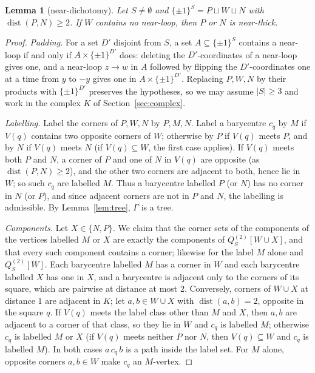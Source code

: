 \documentclass[11pt,letterpaper]{article}
\newtheorem{lemma}[theorem]{Lemma}
\theoremstyle{definition}
\newcommand{\cube}[1]{\{\pm1\}^{#1}}
\DeclareMathOperator{\dist}{dist}
\begin{document}
\begin{lemma}[near-dichotomy]\label{lem:neardichotomy}
Let $S\ne\emptyset$ and $\cube S=P\sqcup W\sqcup N$ with $\dist(P,N)\ge2$. If $W$ contains no
near-loop, then $P$ or $N$ is near-thick.
\end{lemma}

\begin{proof}
\emph{Padding.} For a set $D'$ disjoint from $S$, a set $A\subseteq\cube S$ contains a near-loop if and
only if $A\times\cube{D'}$ does: deleting the $D'$-coordinates of a near-loop gives one, and a near-loop
$z\to w$ in $A$ followed by flipping the $D'$-coordinates one at a time from $y$ to $-y$ gives one in
$A\times\cube{D'}$. Replacing $P,W,N$ by their products with $\cube{D'}$ preserves the hypotheses, so we
may assume $|S|\ge3$ and work in the complex $K$ of Section~\ref{sec:complex}.

\emph{Labelling.} Label the corners of $P,W,N$ by $P,M,N$. Label a barycentre $c_q$ by $M$ if $V(q)$
contains two opposite corners of $W$; otherwise by $P$ if $V(q)$ meets $P$, and by $N$ if $V(q)$ meets
$N$ (if $V(q)\subseteq W$, the first case applies). If $V(q)$ meets both $P$ and $N$, a corner of $P$ and
one of $N$ in $V(q)$ are opposite (as $\dist(P,N)\ge2$), and the other two corners are adjacent to both,
hence lie in $W$; so such $c_q$ are labelled $M$. Thus a barycentre labelled $P$ (or $N$) has no corner in
$N$ (or $P$), and since adjacent corners are not in $P$ and $N$, the labelling is admissible. By
Lemma~\ref{lem:tree}, $\Gamma$ is a tree.

\emph{Components.} Let $X\in\{N,P\}$. We claim that the corner sets of the components of the vertices
labelled $M$ or $X$ are exactly the components of $Q^{(2)}_S[W\cup X]$, and that every such component
contains a corner; likewise for the label $M$ alone and $Q^{(2)}_S[W]$. Each barycentre labelled $M$ has a
corner in $W$ and each barycentre labelled $X$ has one in $X$, and a barycentre is adjacent only to the
corners of its square, which are pairwise at distance at most $2$. Conversely, corners of $W\cup X$ at
distance $1$ are adjacent in $K$; let $a,b\in W\cup X$ with $\dist(a,b)=2$, opposite in the square $q$. If $V(q)$ meets the label class other than $M$ and $X$, then
$a,b$ are adjacent to a corner of that class, so they lie in $W$ and $c_q$ is labelled $M$; otherwise
$c_q$ is labelled $M$ or $X$ (if $V(q)$ meets neither $P$ nor $N$, then $V(q)\subseteq W$ and $c_q$ is labelled $M$). In both cases $a\,c_q\,b$ is a path inside the label set. For $M$ alone,
opposite corners $a,b\in W$ make $c_q$ an $M$-vertex.


\end{proof}
\end{document}
